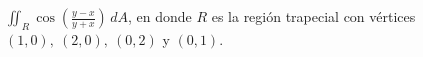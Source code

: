 \item $\iint_R \cos\left(\frac{y - x}{y + x}\right) \, dA$, en donde $R$ es la región trapecial con vértices $(1, 0), \ (2, 0), \ (0, 2)$ y $(0, 1)$.
